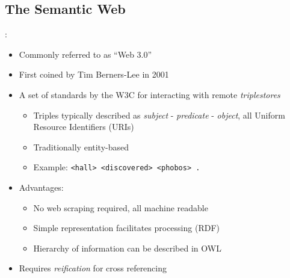 \documentclass[logoontitle,tabu,supertabular,aspectratio=43]{preney-uwindsor-beamer}
\begin{document}
    \subsection{The Semantic Web}
    \begin{frame}{\insertsection: \insertsubsection}
        \begin{itemize}
            \item Commonly referred to as ``Web 3.0''
            \item First coined by Tim Berners-Lee in 2001 \cite{berners2001semantic}
            \item A set of standards by the W3C for interacting with remote {\em triplestores} \cite{w3csemanticweb}
            \begin{itemize}
                \item Triples typically described as {\em subject} - {\em predicate} - {\em object}, all Uniform Resource Identifiers (URIs)
                \item Traditionally entity-based
                \item Example: \texttt{<hall> <discovered> <phobos> .}
            \end{itemize}
            \item Advantages:
            \begin{itemize}
                \item No web scraping required, all machine readable
                \item Simple representation facilitates processing (RDF) \cite{w3c}
                \item Hierarchy of information can be described in OWL \cite{mcguinness2004owl}
            \end{itemize}
            \item Requires {\em reification} for cross referencing
        \end{itemize}
    \end{frame}

\end{document}
